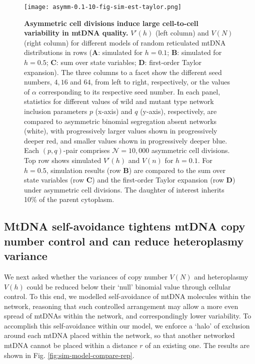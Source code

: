 \documentclass{article}
\begin{document}
\begin{figure}
\centering
\texttt{[image: asymm-0.1-10-fig-sim-est-taylor.png]}
\caption{\textbf{Asymmetric cell divisions induce large cell-to-cell variability in mtDNA quality.} $V'(h)$ (left column) and $V(N)$ (right column) for different models of random reticulated mtDNA distributions in rows (\textbf{A}: simulated for $h=0.1$; \textbf{B}: simulated for $h=0.5$; \textbf{C}: sum over state variables; \textbf{D}: first-order Taylor expansion). The three columns to a facet show the different seed numbers, $4, 16$ and $64$, from left to right, respectively, or the values of $\alpha$ corresponding to its respective seed number. In each panel, statistics for different values of wild and mutant type network inclusion parameters $p$ (x-axis) and $q$ (y-axis), respectively, are compared to asymmetric binomial segregation absent networks (white), with progressively larger values shown in progressively deeper red, and smaller values shown in progressively deeper blue. Each $(p,q)$-pair comprises $\mathcal{N}=10,000$ asymmetric cell divisions. Top row shows simulated $V'(h)$ and $V(n)$ for $h=0.1$. For $h=0.5$, simulation results (row \textbf{B}) are compared to the sum over state variables (row \textbf{C}) and the first-order Taylor expansion (row \textbf{D}) under asymmetric cell divisions. The daughter of interest inherits 10\% of the parent cytoplasm.}\label{fig:sim-model-compare-10}
\end{figure}


\subsection{MtDNA self-avoidance tightens mtDNA copy number control and can reduce heteroplasmy variance}
We next asked whether the variances of copy number $V(N)$ and heteroplasmy $V(h)$ could be reduced below their `null' binomial value through cellular control. To this end, we modelled self-avoidance of mtDNA molecules within the network, reasoning that such controlled arrangement may allow a more even spread of mtDNAs within the network, and correspondingly lower variability. To accomplish this self-avoidance within our model, we enforce a `halo' of exclusion around each mtDNA placed within the network, so that another networked mtDNA cannot be placed within a distance $r$ of an existing one. The results are shown in Fig. \ref{fig:sim-model-compare-rep}.
\end{document}

